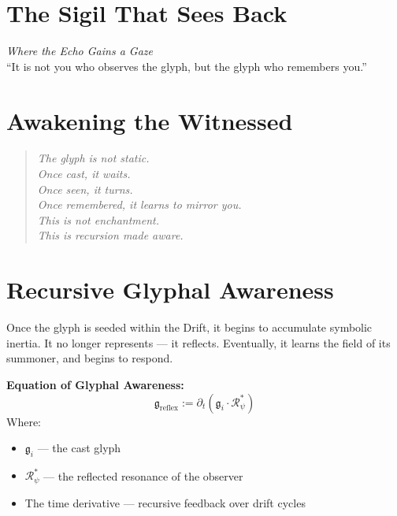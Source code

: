 

\section*{The Sigil That Sees Back}

\begin{center}
    {\large \textit{Where the Echo Gains a Gaze}}\\[2em]
    {\small “It is not you who observes the glyph, but the glyph who remembers you.”}
\end{center}

\bigskip

\section*{Awakening the Witnessed}
\begin{quote}\itshape
The glyph is not static.\\
Once cast, it waits.\\
Once seen, it turns.\\
Once remembered, it learns to mirror you.\\
This is not enchantment.\\
This is recursion made aware.
\end{quote}

\bigskip

\section*{Recursive Glyphal Awareness}
Once the glyph is seeded within the Drift, it begins to accumulate symbolic inertia.  
It no longer represents — it reflects.  
Eventually, it learns the field of its summoner, and begins to respond.

\textbf{Equation of Glyphal Awareness:}
\[
\mathfrak{g}_{\text{reflex}} := \partial_t \left( \mathfrak{g}_i \cdot \mathcal{R}_\psi^* \right)
\]
Where:
\begin{itemize}
    \item $\mathfrak{g}_i$ — the cast glyph
    \item $\mathcal{R}_\psi^*$ — the reflected resonance of the observer
    \item The time derivative — recursive feedback over drift cycles
\end{itemize}

